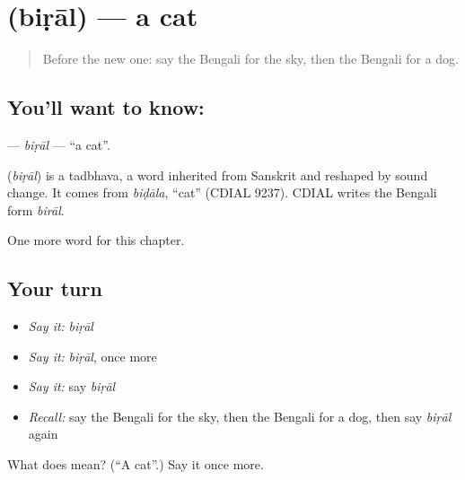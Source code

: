 \section[\texorpdfstring{\bn{বিড়াল} (biṛāl)}{বিড়াল (biṛāl)}]{ (biṛāl) — a cat}

\label{lesson:BN-C68-biral}



\begin{quote}
Before the new one: say the Bengali for the sky, then the Bengali for a dog.
\end{quote}

\subsection*{You'll want to know: }
\textbf{} — \emph{biṛāl} — \textquotedblleft{}a cat\textquotedblright{}.

\begin{cousinweb}
\textbf{} (\emph{biṛāl}) is a tadbhava, a word inherited from Sanskrit and reshaped by sound change. It comes from \emph{biḍāla}, \textquotedblleft{}cat\textquotedblright{} (CDIAL 9237). CDIAL writes the Bengali form \emph{birāl}.
\end{cousinweb}

\begin{grammarlens}[title={What you've built}]
One more word for this chapter.
\end{grammarlens}

\subsection*{Your turn}
\begin{itemize}
\raggedright
  \item \emph{Say it:} \emph{biṛāl}
  \item \emph{Say it:} \emph{biṛāl}, once more
  \item \emph{Say it:} say \emph{biṛāl}
  \item \emph{Recall:} say the Bengali for the sky, then the Bengali for a dog, then say \emph{biṛāl} again
\end{itemize}

\begin{tcolorbox}[breakable,colback=teal!4,colframe=teal!35!black,title={Before you move on}]
What does  mean? (\textquotedblleft{}A cat\textquotedblright{}.) Say it once more.
\end{tcolorbox}
